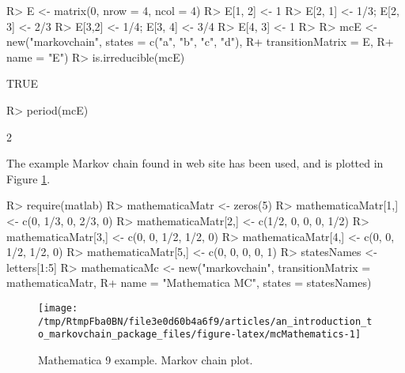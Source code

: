 \documentclass[
  nojss]{jss}
\begin{document}
\begin{CodeChunk}

\begin{CodeInput}
R> E <- matrix(0, nrow = 4, ncol = 4)
R> E[1, 2] <- 1
R> E[2, 1] <- 1/3; E[2, 3] <- 2/3
R> E[3,2] <- 1/4; E[3, 4] <- 3/4
R> E[4, 3] <- 1
R> 
R> mcE <- new("markovchain", states = c("a", "b", "c", "d"), 
R+      transitionMatrix = E, 
R+      name = "E")
R> is.irreducible(mcE)
\end{CodeInput}

\begin{CodeOutput}
[1] TRUE
\end{CodeOutput}

\begin{CodeInput}
R> period(mcE)
\end{CodeInput}

\begin{CodeOutput}
[1] 2
\end{CodeOutput}
\end{CodeChunk}

The example Markov chain found in  web site \citep{mathematica9MarkovChain} has
been used, and is plotted in Figure \ref{fig:mcMathematics}.

\begin{CodeChunk}

\begin{CodeInput}
R> require(matlab)
R> mathematicaMatr <- zeros(5)
R> mathematicaMatr[1,] <- c(0, 1/3, 0, 2/3, 0)
R> mathematicaMatr[2,] <- c(1/2, 0, 0, 0, 1/2)
R> mathematicaMatr[3,] <- c(0, 0, 1/2, 1/2, 0)
R> mathematicaMatr[4,] <- c(0, 0, 1/2, 1/2, 0)
R> mathematicaMatr[5,] <- c(0, 0, 0, 0, 1)
R> statesNames <- letters[1:5]
R> mathematicaMc <- new("markovchain", transitionMatrix = mathematicaMatr,
R+                    name = "Mathematica MC", states = statesNames)
\end{CodeInput}
\end{CodeChunk}

\begin{CodeChunk}
\begin{figure}

{\centering \texttt{[image: /tmp/RtmpFba0BN/file3e0d60b4a6f9/articles/an\_introduction\_to\_markovchain\_package\_files/figure-latex/mcMathematics-1]} 

}

\caption[Mathematica 9 example]{Mathematica 9 example. Markov chain plot.}\label{fig:mcMathematics}
\end{figure}
\end{CodeChunk}
\end{document}
